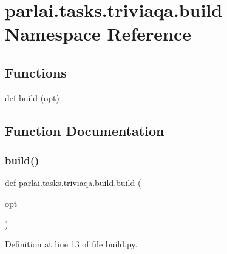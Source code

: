 \hypertarget{namespaceparlai_1_1tasks_1_1triviaqa_1_1build}{}\section{parlai.\+tasks.\+triviaqa.\+build Namespace Reference}
\label{namespaceparlai_1_1tasks_1_1triviaqa_1_1build}
\subsection*{Functions}
\begin{DoxyCompactItemize}
\item 
def \hyperlink{namespaceparlai_1_1tasks_1_1triviaqa_1_1build_a2e4e4e43e9c7bdb10a786035307d2227}{build} (opt)
\end{DoxyCompactItemize}


\subsection{Function Documentation}
\mbox{\label{namespaceparlai_1_1tasks_1_1triviaqa_1_1build_a2e4e4e43e9c7bdb10a786035307d2227}} 
\subsubsection{\texorpdfstring{build()}{build()}}
{\footnotesize\ttfamily def parlai.\+tasks.\+triviaqa.\+build.\+build (\begin{DoxyParamCaption}\item[{}]{opt }\end{DoxyParamCaption})}



Definition at line 13 of file build.\+py.

